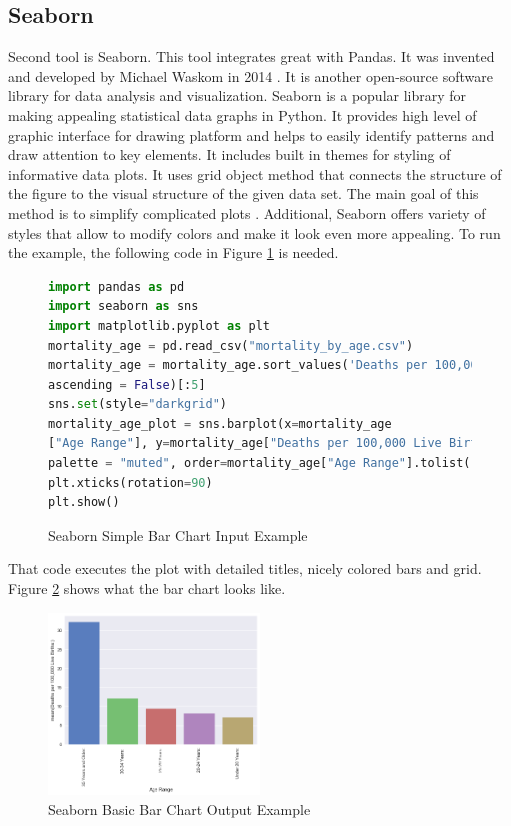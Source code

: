\documentclass[sigconf]{acmart}
\begin{document}
\subsection{Seaborn}

Second tool is Seaborn. This tool integrates great with Pandas. It was invented and developed by Michael Waskom in 2014 \cite{waskom2014seaborn}. It is another  open-source software library for data analysis and visualization. Seaborn is a popular library for making appealing statistical data graphs in Python. It provides high level of graphic interface for drawing platform and helps to easily identify patterns and draw attention to key elements. It includes built in themes for styling of informative data plots. It uses grid object method that connects the structure of the figure to the visual structure of the given data set. The main goal of this method is to simplify complicated plots \cite{bloice2016tutorial}. Additional, Seaborn offers variety of styles that allow to modify colors and make it look even more appealing. To run the example, the following code in Figure \ref{fig:figure3} \cite{md} is needed.

\begin{figure}
\begin{lstlisting}[language=Python]
import pandas as pd
import seaborn as sns
import matplotlib.pyplot as plt
mortality_age = pd.read_csv("mortality_by_age.csv")
mortality_age = mortality_age.sort_values('Deaths per 100,000 Live Births:',
ascending = False)[:5]
sns.set(style="darkgrid")
mortality_age_plot = sns.barplot(x=mortality_age
["Age Range"], y=mortality_age["Deaths per 100,000 Live Births:"],
palette = "muted", order=mortality_age["Age Range"].tolist())
plt.xticks(rotation=90)
plt.show()
\end{lstlisting}
\caption{Seaborn Simple Bar Chart Input Example \cite{md} }
\label{fig:figure3}
\end{figure}

That code executes the plot with detailed titles, nicely colored bars and grid. Figure \ref{fig:figure4} \cite{md} shows what the bar chart looks like.

\begin{figure}
  \centering
  \includegraphics[width=0.5\textwidth]{images/output_1_0.png}
  \caption{Seaborn Basic Bar Chart Output Example \cite{md}} \label{fig:figure4} 
\end{figure}
\end{document}
